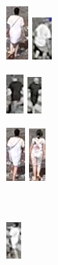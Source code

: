 \begin{figure}
    \newlength{\fpheight}
    \setlength{\fpheight}{3cm}


    \centering
    
    \begin{subfigure}[b]{0.3\textwidth}
         \centering
         \includegraphics[height=\fpheight]{img/fp_0_a.png}
         \includegraphics[height=\fpheight]{img/fp_0_b.png}
    \end{subfigure}
    \begin{subfigure}[b]{0.3\textwidth}
         \centering
         \includegraphics[height=\fpheight]{img/fp_1_a.png}
         \includegraphics[height=\fpheight]{img/fp_1_b.png}
    \end{subfigure}
    \begin{subfigure}[b]{0.3\textwidth}
         \centering
         \includegraphics[height=\fpheight]{img/fp_2_a.png}
         \includegraphics[height=\fpheight]{img/fp_2_b.png}
    \end{subfigure}\\
    \vspace{1cm}
    \begin{subfigure}[b]{0.3\textwidth}
         \centering
         \includegraphics[height=\fpheight]{img/fp_3_a.png}

\end{subfigure}
\end{figure}
